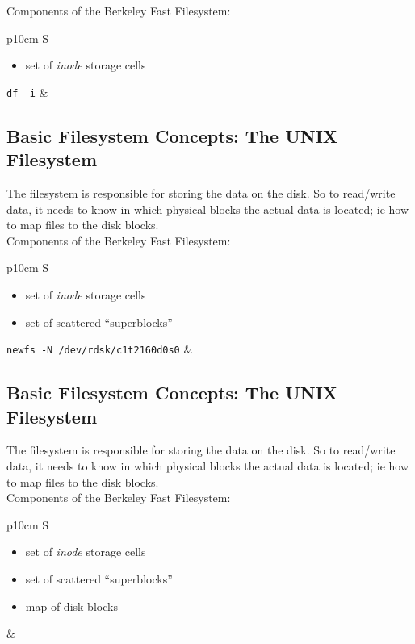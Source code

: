\documentclass[xga]{xdvislides}
\begin{document}
Components of the Berkeley Fast Filesystem:
\\

\begin{tabular}{ p{10cm} S }
\begin{itemize}
	\item set of {\em inode} storage cells
\end{itemize}
{\tt df -i}
&  \\
\end{tabular}

\subsection{Basic Filesystem Concepts: The UNIX Filesystem}
The filesystem is responsible for storing the data on the disk.
So to read/write data, it needs to know in which physical blocks the actual
data is located; ie how to map files to the disk blocks.
\\

Components of the Berkeley Fast Filesystem:
\\

\begin{tabular}{ p{10cm} S }
\begin{itemize}
	\item set of {\em inode} storage cells
	\item set of scattered ``superblocks''
\end{itemize}
{\tt newfs -N /dev/rdsk/c1t2160d0s0}
&  \\
\end{tabular}

\subsection{Basic Filesystem Concepts: The UNIX Filesystem}
The filesystem is responsible for storing the data on the disk.
So to read/write data, it needs to know in which physical blocks the actual
data is located; ie how to map files to the disk blocks.
\\

Components of the Berkeley Fast Filesystem:
\\

\begin{tabular}{ p{10cm} S }
\begin{itemize}
	\item set of {\em inode} storage cells
	\item set of scattered ``superblocks''
	\item map of disk blocks
\end{itemize}
&  \\
\end{tabular}
\end{document}
